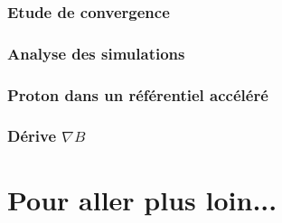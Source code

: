 \documentclass[a4paper,12pt,twoside]{article}
\begin{document}
\subsubsection{Etude de convergence}

\subsubsection{Analyse des simulations}

\subsubsection{Proton dans un référentiel accéléré}

\subsubsection{Dérive $\nabla B$}

\section{Pour aller plus loin...}
\end{document}
